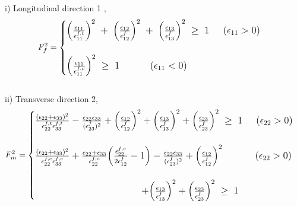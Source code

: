 \documentclass[12pt,a4paper,twoside,openright]{report}
\begin{document}
i) Longitudinal direction 1 ,
\begin{equation}
\large{F_{f}^{2} =  
	\begin{cases}
	
		\Big(\frac{\epsilon_{11}}{\epsilon_{11}^{f,t}}\Big)^{2} \; + \; \Big(\frac{\epsilon_{12}}{\epsilon_{12}^{f}}\Big)^{2} \; + \; \Big(\frac{\epsilon_{13}}{\epsilon_{13}^{f}}\Big)^{2} \; \geq  \; 1  \; \; \; \; \;  (\epsilon_{11}  >  0)  \\
	\\
	\Big(\frac{\epsilon_{11}}{\epsilon_{11}^{f,c}}\Big)^{2}  \; \geq  \; 1 \; \; \; \; \; \; \;  \; \; \; \;  (\epsilon_{11}  <  0) 

	
	\end{cases}}
\end{equation}
\\
ii) Transverse direction 2,
\\
\begin{equation}
\large{F_{m}^{2} =  
	\begin{cases}
	
	\frac{(\epsilon_{22} + \epsilon_{33} )^{2}}{\epsilon_{22}^{f,t} \epsilon_{33}^{f,t}}   -  \frac{\epsilon_{22}\epsilon_{33}}{(\epsilon_{23}^{f})^{2}}  +  \Big(\frac{\epsilon_{12}}{\epsilon_{12}^{f}}\Big)^{2}  + \Big(\frac{\epsilon_{13}}{\epsilon_{13}^{f}}\Big)^{2}  +  \Big(\frac{\epsilon_{23}}{\epsilon_{23}^{f}}\Big)^{2} \;\geq  \; 1 \; \; \; \; \;  (\epsilon_{22}  >  0) \\
	\\
	
	\frac{(\epsilon_{22} + \epsilon_{33} )^{2}}{\epsilon_{22}^{f,c} \epsilon_{33}^{f,c}}  +  \frac{\epsilon_{22} + \epsilon_{33}}{\epsilon_{22}^{f,c}}\Big(\frac{\epsilon_{22}^{f,c}}{2\epsilon_{12}^{f}}  -  1\Big)   -  \frac{\epsilon_{22}\epsilon_{33}}{(\epsilon_{23}^{f})^{2}}  +  \Big(\frac{\epsilon_{12}}{\epsilon_{12}^{f}}\Big)^{2}\; \; \; \; \; \; \; \; \; \; \; \;  (\epsilon_{22}  >  0) \\ 
\\	
	\; \; \; \; \; \; \; \;\; \; \; \; \; \; \; \;\; \; \; \; \; \; \; \;  \; \;\; \; \; \; \; \; \; \;\; \; \; \; \;  + \Big(\frac{\epsilon_{13}}{\epsilon_{13}^{f}}\Big)^{2}   +  \Big(\frac{\epsilon_{23}}{\epsilon_{23}^{f}}\Big)^{2} \;\geq \; 1 
	
	
	\end{cases}}
\end{equation}
\\
\end{document}
